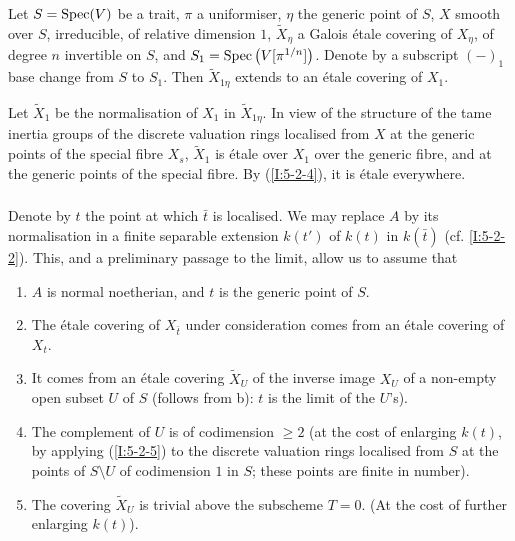 \begin{lemma}\label{I:5-2-5} %
Let $S=\operatorname{Spec}(V)$ be a trait, $\pi$ a uniformiser, $\eta$ the generic
point of $S$, $X$ smooth over $S$, irreducible, of relative
dimension $1$, $\widetilde X_\eta$ a Galois \'etale covering of $X_\eta$,
of degree $n$ invertible on $S$, and $S_1=\operatorname{Spec}\left(V[\pi^{1/n}]\right)$.
Denote by a subscript $(-)_1$ base change from $S$ to $S_1$. Then
$\widetilde X_{1\eta}$ extends to an \'etale covering of $X_1$.
\end{lemma}

Let $\widetilde X_1$ be the normalisation of $X_1$ in $\widetilde X_{1\eta}$.
In view of the structure of the tame inertia groups of the discrete
valuation rings localised from $X$ at the generic points of the special fibre
$X_s$, $\widetilde X_1$ is \'etale over $X_1$ over the generic fibre, and at
the generic points of the special fibre. By (\ref{I:5-2-4}), it is \'etale
everywhere. 





\subsubsection{}\label{I:5-2-6} %

Denote by $t$ the point at which $\bar t$ is localised. We may replace
$A$ by its normalisation in a finite separable extension
$k(t')$ of $k(t)$ in $k(\bar t)$ (cf. \ref{I:5-2-2}). This, and a preliminary
passage to the limit, allow us to assume that
\begin{enumerate}[\indent a)]
  \item $A$ is normal noetherian, and $t$ is the generic point of $S$.
  \item The \'etale covering of $X_{\bar t}$ under consideration comes from an
    \'etale covering of $X_t$.
  \item It comes from an \'etale covering $\widetilde X_U$ of the inverse
    image $X_U$ of a non-empty open subset $U$ of $S$ (follows from b): $t$
    is the limit of the $U$'s).
  \item The complement of $U$ is of codimension $\geqslant 2$ (at the cost
    of enlarging $k(t)$, by applying (\ref{I:5-2-5}) to the discrete
    valuation rings localised from $S$ at the points of $S\setminus U$ of
    codimension $1$ in $S$; these points are finite in number).
  \item The covering $\widetilde X_U$ is trivial above the subscheme
    $T=0$. (At the cost of further enlarging $k(t)$).
\end{enumerate}

